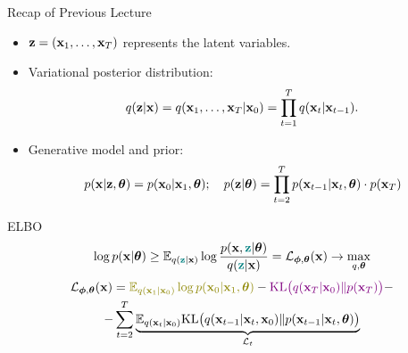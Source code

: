 \documentclass{beamer}
\begin{document}
\begin{frame}{Recap of Previous Lecture}
	\begin{itemize}
		\item $\mathbf{z} = (\mathbf{x}_1, \dots, \mathbf{x}_T)$ represents the latent variables.
		\item Variational posterior distribution:
		\vspace{-0.2cm}
		\[
			q(\mathbf{z} | \mathbf{x}) = q(\mathbf{x}_1, \dots, \mathbf{x}_T | \mathbf{x}_0) = \prod_{t = 1}^T q(\mathbf{x}_t | \mathbf{x}_{t - 1}).
		\]
		\vspace{-0.3cm}
		\item Generative model and prior:
		\vspace{-0.2cm}
		\[
			p(\mathbf{x} | \mathbf{z}, \boldsymbol{\theta}) = p(\mathbf{x}_0 | \mathbf{x}_1, \boldsymbol{\theta}); \quad 
			p(\mathbf{z} | \boldsymbol{\theta}) = \prod_{t=2}^T p(\mathbf{x}_{t - 1} | \mathbf{x}_t, \boldsymbol{\theta}) \cdot p(\mathbf{x}_T)
		\]
	\end{itemize}
	\vspace{-0.2cm}
	\begin{block}{ELBO}
		\vspace{-0.2cm}
		\[
			\log p(\mathbf{x} | \boldsymbol{\theta}) \geq \mathbb{E}_{q({\color{teal}\mathbf{z}} | \mathbf{x})} \log \frac{p(\mathbf{x}, {\color{teal}\mathbf{z}} | \boldsymbol{\theta})}{q({\color{teal}\mathbf{z}} | \mathbf{x})} = \mathcal{L}_{\boldsymbol{\phi}, \boldsymbol{\theta}}(\mathbf{x}) \rightarrow \max_{q, \boldsymbol{\theta}}
		\]
		\vspace{-0.5cm}
		\begin{multline*}
			\cL_{\bphi, \btheta}(\bx) =  {\color{olive}\bbE_{q(\bx_1 | \bx_0)} \log p(\bx_0 | \bx_1, \btheta)} - {\color{violet}\KL\bigl(q(\bx_T | \bx_0) \| p(\bx_T)\bigr)} - \\
			- \sum_{t=2}^T  \underbrace{ \bbE_{q(\bx_t | \bx_0)}\KL \bigl(q(\bx_{t-1} | \bx_t, \bx_0) \| p(\bx_{t - 1} | \bx_t, \btheta )\bigr)}_{\cL_t}
		\end{multline*}
	\end{block}
\end{frame}
\end{document}
